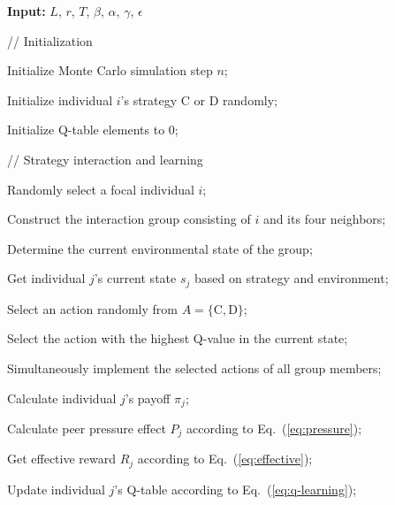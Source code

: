 \documentclass[%
  aip,
  amsmath,amssymb,
  reprint,
  showkeys,
]{revtex4-1}
\begin{document}
\begin{algorithm}[H]
\caption{Pseudocode of spatial public goods game with environment-dependent peer pressure and Q-learning}
\label{alg:PGG_Qlearning}

\begin{algorithmic}[1]

\STATE \textbf{Input:} $L$, $r$, $T$, $\beta$, $\alpha$, $\gamma$, $\epsilon$

\STATE // Initialization

\STATE Initialize Monte Carlo simulation step $n$;


    \STATE Initialize individual $i$'s strategy $\mathrm{C}$ or $\mathrm{D}$ randomly;

    \STATE Initialize Q-table elements to 0;

\ENDFOR

\STATE // Strategy interaction and learning



        \STATE Randomly select a focal individual $i$;

        \STATE Construct the interaction group consisting of $i$ and its four neighbors;

        \STATE Determine the current environmental state of the group;


            \STATE Get individual $j$'s current state $s_j$ based on strategy and environment;


                \STATE Select an action randomly from $A=\{\mathrm{C},\mathrm{D}\}$;

            \ELSE

                \STATE Select the action with the highest Q-value in the current state;

            \ENDIF

        \ENDFOR

        \STATE Simultaneously implement the selected actions of all group members;


            \STATE Calculate individual $j$'s payoff $\pi_j$;
    
            \STATE Calculate peer pressure effect $P_j$ according to Eq.~(\ref{eq:pressure});
    
            \STATE Get effective reward $R_j$ according to Eq.~(\ref{eq:effective});
    
            \STATE Update individual $j$'s Q-table according to Eq.~(\ref{eq:q-learning});

        \ENDFOR

    \ENDFOR

\ENDFOR

\end{algorithmic}
\end{algorithm}
\end{document}
